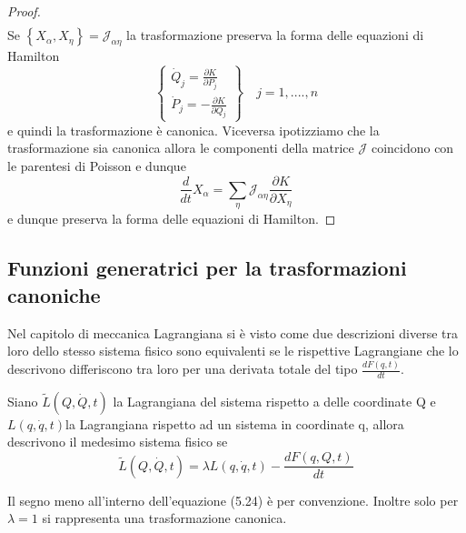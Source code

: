 \begin{proof}
\begin{align}
 \end{align}
 Se $\left\{X_{\alpha}, X_\eta\right\} = \mathcal{J}_{\alpha \eta}$ la trasformazione preserva la forma delle equazioni di Hamilton
\begin{equation}
\left\{\begin{array}{l}
\dot{Q}_j=\frac{\partial K}{\partial P_j} \\[0.1in]
\dot{P}_j=-\frac{\partial K}{\partial Q_j}
\end{array}\right \} \quad j=1,....,n
\end{equation}
e quindi la trasformazione \`{e} canonica. Viceversa ipotizziamo che la trasformazione sia canonica allora le componenti della matrice $\mathcal{J}$ coincidono con le parentesi di Poisson e dunque 
\begin{equation}
\frac{d}{d t} X_\alpha=\sum_\eta \mathcal{J}_{\alpha \eta} \frac{\partial K}{\partial X_\eta}
\end{equation} 
e dunque preserva la forma delle equazioni di Hamilton.

\end{proof}
\subsection{Funzioni generatrici per la trasformazioni canoniche} 



Nel capitolo di meccanica Lagrangiana si \`{e} visto come due descrizioni diverse tra loro dello stesso sistema fisico sono equivalenti se le rispettive Lagrangiane che lo descrivono differiscono tra loro per una derivata totale del tipo $\frac{d F(q,t)}{dt}$. \newline

\begin{theorem}
	Siano $\tilde{L} (Q,\dot{Q},t)$ la Lagrangiana del sistema rispetto a delle coordinate Q e $L(q,\dot{q},t)$la Lagrangiana rispetto ad un sistema in coordinate q, allora descrivono il medesimo sistema fisico se 
	\begin{equation}
		\tilde{L} (Q,\dot{Q},t) = \lambda L(q,\dot{q},t) - \dfrac{dF(q,Q,t)}{dt}
	\end{equation}
\end{theorem}
\begin{remark}
Il segno meno all'interno dell'equazione (5.24) \`{e} per convenzione. Inoltre solo per $\lambda = 1$ si rappresenta una trasformazione canonica.
\end{remark}

